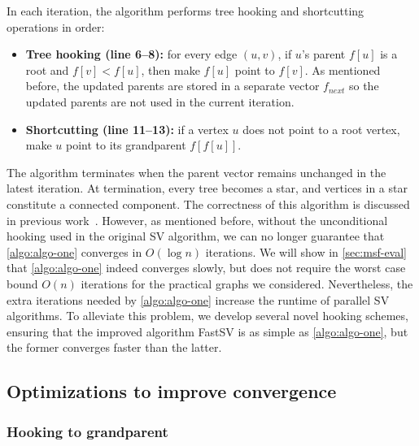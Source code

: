 \documentclass{sokendai_thesis} %
\begin{document}
In each iteration, the algorithm performs tree hooking and shortcutting operations in order:
\begin{itemize}
\item \textbf{Tree hooking (line 6--8):} for every edge $(u,v)$, if $u$'s parent $f[u]$ is a root and $f[v]<f[u]$, then make $f[u]$ point to $f[v]$. As mentioned before, the updated parents are stored in a separate vector $f_{\mathit{next}}$ so the updated parents are not used in the current iteration. 
\item \textbf{Shortcutting (line 11--13):} if a vertex $u$ does not point to a root vertex, make $u$ point to its grandparent $f[f[u]]$.
\end{itemize}

The algorithm terminates when the parent vector remains unchanged in the latest iteration.
At termination, every tree becomes a star, and vertices in a star constitute a connected component. 
The correctness of this algorithm is discussed in previous work~\cite{greiner1994comparison}.
However, as mentioned before, without the unconditional hooking used in the original SV algorithm, we can no longer guarantee that \autoref{algo:algo-one} converges in $O(\log n)$ iterations. 
We will show in \autoref{sec:msf-eval} that \autoref{algo:algo-one} indeed converges slowly, but does not require the worst case bound $O(n)$ iterations for the practical graphs we considered. 
Nevertheless, the extra iterations needed by \autoref{algo:algo-one} increase the runtime of parallel SV algorithms. 
To alleviate this problem, we develop several novel hooking schemes, ensuring that the improved algorithm FastSV  is as simple as \autoref{algo:algo-one}, but the former converges faster than the latter.

\subsection{Optimizations to improve convergence}

\subsubsection{Hooking to grandparent}
\end{document}
